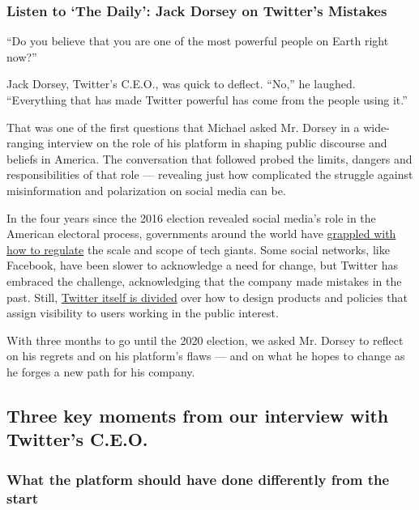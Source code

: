 \hypertarget{listen-to-the-daily-jack-dorsey-on-twitters-mistakes}{%
\subsubsection{Listen to `The Daily': Jack Dorsey on Twitter's
Mistakes}\label{listen-to-the-daily-jack-dorsey-on-twitters-mistakes}}

``Do you believe that you are one of the most powerful people on Earth
right now?''

Jack Dorsey, Twitter's C.E.O., was quick to deflect. ``No,'' he laughed.
``Everything that has made Twitter powerful has come from the people
using it.''

That was one of the first questions that Michael asked Mr. Dorsey in a
wide-ranging interview on the role of his platform in shaping public
discourse and beliefs in America. The conversation that followed probed
the limits, dangers and responsibilities of that role --- revealing just
how complicated the struggle against misinformation and polarization on
social media can be.

In the four years since the 2016 election revealed social media's role
in the American electoral process, governments around the world have
\href{https://www.nytimes.com/2020/08/04/technology/europe-big-tech.html}{grappled
with how to regulate} the scale and scope of tech giants. Some social
networks, like Facebook, have been slower to acknowledge a need for
change, but Twitter has embraced the challenge, acknowledging that the
company made mistakes in the past. Still,
\href{https://www.nytimes.com/2020/05/30/technology/twitter-trump-dorsey.html}{Twitter
itself is divided} over how to design products and policies that assign
visibility to users working in the public interest.

With three months to go until the 2020 election, we asked Mr. Dorsey to
reflect on his regrets and on his platform's flaws --- and on what he
hopes to change as he forges a new path for his company.

\hypertarget{three-key-moments-from-our-interview-with-twitters-ceo}{%
\subsection{Three key moments from our interview with Twitter's
C.E.O.}\label{three-key-moments-from-our-interview-with-twitters-ceo}}

\hypertarget{what-the-platform-should-have-done-differently-from-the-start}{%
\subsubsection{What the platform should have done differently from the
start}\label{what-the-platform-should-have-done-differently-from-the-start}}

